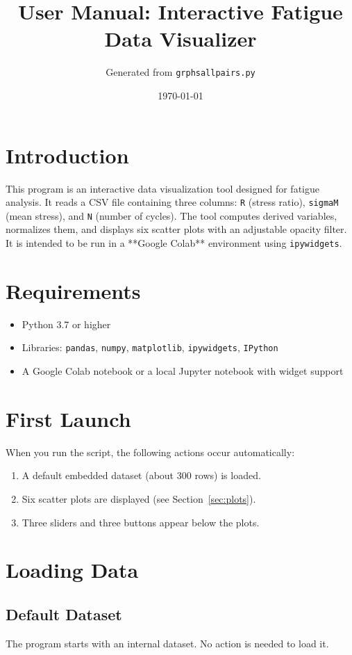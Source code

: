 \documentclass[12pt,a4paper]{article}
\title{User Manual: Interactive Fatigue Data Visualizer}
\author{Generated from \texttt{grphsallpairs.py}}
\date{\today}
\begin{document}
\maketitle

\tableofcontents
\newpage

\section{Introduction}
This program is an interactive data visualization tool designed for fatigue analysis. It reads a CSV file containing three columns: \texttt{R} (stress ratio), \texttt{sigmaM} (mean stress), and \texttt{N} (number of cycles). The tool computes derived variables, normalizes them, and displays six scatter plots with an adjustable opacity filter. It is intended to be run in a **Google Colab** environment using \texttt{ipywidgets}.

\section{Requirements}
\begin{itemize}
    \item Python 3.7 or higher
    \item Libraries: \texttt{pandas}, \texttt{numpy}, \texttt{matplotlib}, \texttt{ipywidgets}, \texttt{IPython}
    \item A Google Colab notebook or a local Jupyter notebook with widget support
\end{itemize}

\section{First Launch}
When you run the script, the following actions occur automatically:
\begin{enumerate}
    \item A default embedded dataset (about 300 rows) is loaded.
    \item Six scatter plots are displayed (see Section~\ref{sec:plots}).
    \item Three sliders and three buttons appear below the plots.
\end{enumerate}

\section{Loading Data}
\subsection{Default Dataset}
The program starts with an internal dataset. No action is needed to load it.
\end{document}
